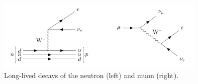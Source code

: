 \begin{figure}
\centering
\includegraphics[width=0.9\textwidth]{figures/intro/neutron_muon_decays.pdf}
\caption{Long-lived decays of the neutron (left) and muon (right).}
\label{neutron_muon_decays}
\end{figure}